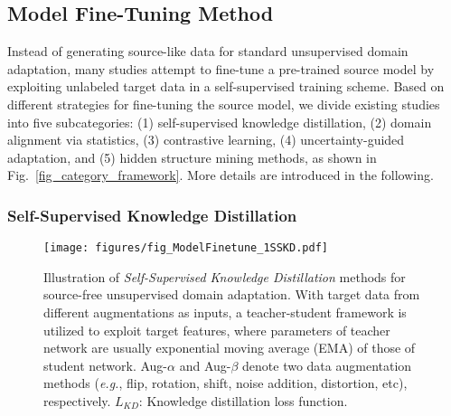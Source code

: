 \documentclass[10pt,journal,compsoc]{IEEEtran}
\def\eg{{\em e.g.}}
\begin{document}
\subsection{Model Fine-Tuning Method}\label{sec_model_finetune}
Instead of generating source-like data for standard unsupervised domain adaptation, many studies attempt to fine-tune a pre-trained source model by exploiting unlabeled target data in a self-supervised training scheme.
Based on different strategies for fine-tuning the source model, we divide existing studies into five subcategories: (1) self-supervised knowledge distillation, (2) domain alignment via statistics, (3) contrastive learning, (4) uncertainty-guided adaptation, and (5) hidden structure mining methods, as shown in Fig.~\ref{fig_category_framework}. 
More details are introduced in the following. %

\subsubsection{Self-Supervised Knowledge Distillation}\label{sec_white_sskd}

\begin{figure}[!t]
\setlength{\abovecaptionskip}{0pt}
\setlength{\belowcaptionskip}{-2pt}
\setlength{\abovedisplayskip}{-2pt}
\setlength{\belowdisplayskip}{-2pt}
	\centering
	\texttt{[image: figures/fig\_ModelFinetune\_1SSKD.pdf]}
	\caption{Illustration of \emph{Self-Supervised Knowledge Distillation} methods for source-free unsupervised domain adaptation.
	With target data from different augmentations as inputs, a teacher-student framework is utilized to exploit target features, where parameters of teacher network are usually exponential moving average (EMA) of those of student network.
	Aug-$\alpha$ and Aug-$\beta$ denote two data augmentation methods (\eg, flip, rotation, shift, noise addition, distortion, etc), respectively. 
	$L_{KD}$: Knowledge distillation loss function.
	}
	\label{fig_ModelFinetune_1SSKD}
\end{figure}
\end{document}
